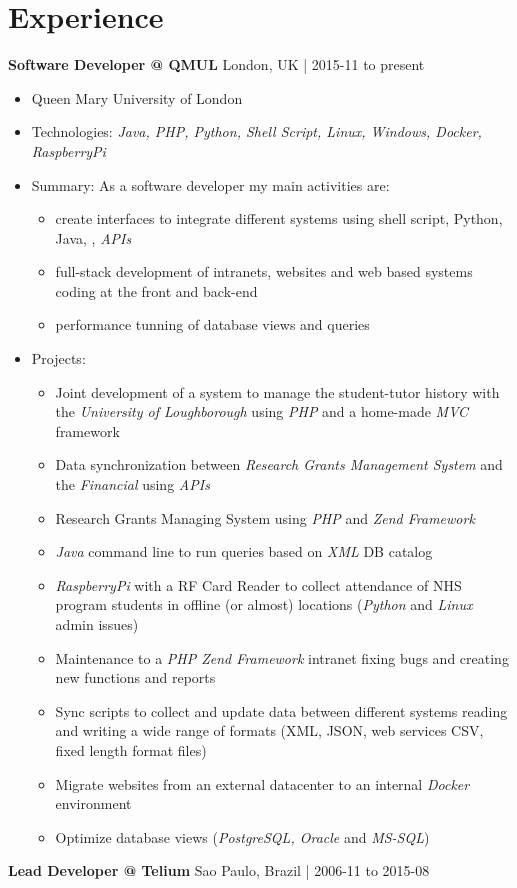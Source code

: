 \documentclass[margin,a4paper]{res}
\def\tightlist{}
\begin{document}
{\hypertarget{experience}{%
\section{Experience}\label{experience}}

\textbf{Software Developer @ QMUL} \hfill London, UK | 2015-11 to
present

\begin{itemize}
\tightlist
\item
  Queen Mary University of London
\item
  Technologies: \emph{Java, PHP, Python, Shell Script, Linux, Windows,
  Docker, RaspberryPi}
\item
  Summary: As a software developer my main activities are:

  \begin{itemize}
  \tightlist
  \item
    create interfaces to integrate different systems using shell script,
    Python, Java, , \emph{APIs}
  \item
    full-stack development of intranets, websites and web based systems
    coding at the front and back-end
  \item
    performance tunning of database views and queries
  \end{itemize}
\item
  Projects:

  \begin{itemize}
  \tightlist
  \item
    Joint development of a system to manage the student-tutor history
    with the \emph{University of Loughborough} using \emph{PHP} and a
    home-made \emph{MVC} framework
  \item
    Data synchronization between \emph{Research Grants Management
    System} and the \emph{Financial} using \emph{APIs}
  \item
    Research Grants Managing System using \emph{PHP} and \emph{Zend
    Framework}
  \item
    \emph{Java} command line to run queries based on \emph{XML} DB
    catalog
  \item
    \emph{RaspberryPi} with a RF Card Reader to collect attendance of
    NHS program students in offline (or almost) locations (\emph{Python}
    and \emph{Linux} admin issues)
  \item
    Maintenance to a \emph{PHP Zend Framework} intranet fixing bugs and
    creating new functions and reports
  \item
    Sync scripts to collect and update data between different systems
    reading and writing a wide range of formats (XML, JSON, web services
    CSV, fixed length format files)
  \item
    Migrate websites from an external datacenter to an internal
    \emph{Docker} environment
  \item
    Optimize database views (\emph{PostgreSQL, Oracle} and
    \emph{MS-SQL})
  \end{itemize}
\end{itemize}
\pagebreak
\textbf{Lead Developer @ Telium} \hfill Sao Paulo, Brazil | 2006-11
to 2015-08

}
\end{document}
